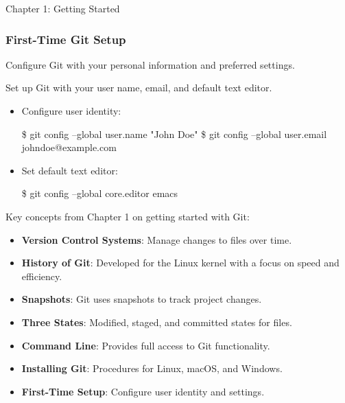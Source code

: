 \begin{notes}{Chapter 1: Getting Started}
\begin{highlight}
    \end{highlight}
    
    \subsubsection*{First-Time Git Setup}
    
    Configure Git with your personal information and preferred settings.
    
    \begin{highlight}
    
        Set up Git with your user name, email, and default text editor.
        
        \begin{itemize}
            \item Configure user identity:
    \begin{code}[Bash]
    \$ git config --global user.name "John Doe"
    \$ git config --global user.email johndoe@example.com
    \end{code}
            \item Set default text editor:
    \begin{code}[Bash]
    \$ git config --global core.editor emacs
    \end{code}
        \end{itemize}
    
    \end{highlight}
    
    \begin{highlight}
    
        Key concepts from Chapter 1 on getting started with Git:
        
        \begin{itemize}
            \item \textbf{Version Control Systems}: Manage changes to files over time.
            \item \textbf{History of Git}: Developed for the Linux kernel with a focus on speed and efficiency.
            \item \textbf{Snapshots}: Git uses snapshots to track project changes.
            \item \textbf{Three States}: Modified, staged, and committed states for files.
            \item \textbf{Command Line}: Provides full access to Git functionality.
            \item \textbf{Installing Git}: Procedures for Linux, macOS, and Windows.
            \item \textbf{First-Time Setup}: Configure user identity and settings.
        \end{itemize}
        
    \end{highlight}
\end{notes}

